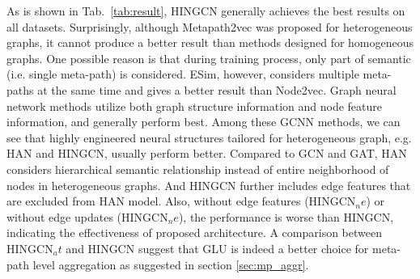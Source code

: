 As is shown in Tab.~\ref{tab:result}, HINGCN generally achieves the best results on all datasets.
Surprisingly, although Metapath2vec was proposed for heterogeneous graphs, it cannot produce a better result than methods designed for homogeneous graphs. One possible reason is that during training process, only part of semantic (i.e. single meta-path) is considered. ESim, however, considers multiple meta-paths at the same time and gives a better result than Node2vec. Graph neural network methods utilize both graph structure information and node feature information, and generally perform best. Among  these GCNN methods, we can see that highly engineered neural structures tailored for heterogeneous graph, e.g. HAN and HINGCN, usually perform better. Compared to GCN and GAT, HAN considers hierarchical semantic relationship instead of entire neighborhood of nodes in heterogeneous graphs. And HINGCN further includes edge features that are excluded from HAN model. Also, without edge features (HINGCN$_ne$) or without edge updates (HINGCN$_ne$), the performance is worse than HINGCN, indicating the effectiveness of proposed architecture. A comparison between HINGCN$_at$ and HINGCN suggest that GLU is indeed a better choice for meta-path level aggregation as suggested in section \ref{sec:mp_aggr}.

